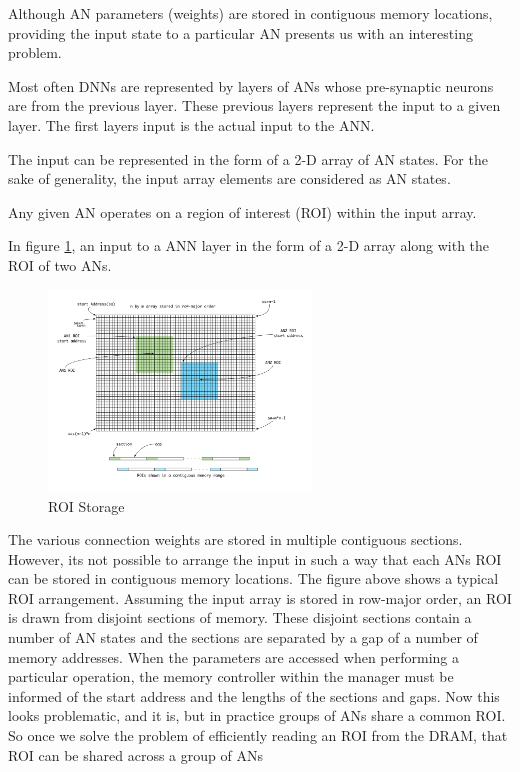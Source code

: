 \documentclass[journal]{IEEEtran}
\begin{document}
Although AN parameters (weights) are stored in contiguous memory locations, providing the input state to a particular AN presents us with an interesting problem.

Most often DNNs are represented by layers of ANs whose pre-synaptic neurons are from the previous layer. These previous layers represent the input to a given layer. The first layers input is the actual input to the ANN.


The input can be represented in the form of a 2-D array of AN states. For the sake of generality, the input array elements are considered as AN states.

Any given AN operates on a region of interest (ROI) within the input array.

In figure \ref{fig:roiStorage}, an input to a ANN layer in the form of a 2-D array along with the ROI of two ANs.

\begin{figure}[!t]
\centerline{
\mbox{\includegraphics[width=2.75in]{roiStorage.jpg}}
}
\caption{ROI Storage}
\label{fig:roiStorage}
\end{figure}

The various connection weights are stored in multiple contiguous sections. However, its not possible to arrange the input in such a way that each ANs ROI can be stored in contiguous memory locations. The figure above shows a typical ROI arrangement. Assuming the input array is stored in row-major order, an ROI is drawn from disjoint sections of memory. 
These disjoint sections contain a number of AN states and the sections are separated by a gap of a number of memory addresses. When the parameters are accessed when performing a particular operation, the memory controller within the manager must be informed of the start address and the lengths of the sections and gaps. Now this looks problematic, and it is, but in practice groups of ANs share a common ROI. So once we solve the problem of efficiently reading an ROI from the DRAM, that ROI can be shared across a group of ANs
\end{document}
